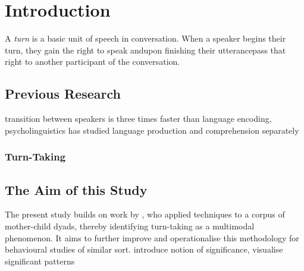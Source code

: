 
\chapter{Introduction}
A \emph{turn} is a basic unit of speech in conversation. When a speaker begins their turn, they gain the right to speak and\dash upon finishing their utterance\dash pass that right to another participant of the conversation.

\section{Previous Research}
\cite{levinson16} transition between speakers is three times faster than language encoding, psycholinguistics has studied language production and comprehension separately

\subsection{Turn-Taking}
\cite{stivers09}

\subsection{\fpm}



\section{The Aim of this Study}
The present study builds on work by , who applied \fpm{} techniques to a corpus of mother-child dyads, thereby identifying turn-taking as a multimodal phenomenon. It aims to further improve and operationalise this methodology for behavioural studies of similar sort.
introduce notion of significance, visualise significant patterns


























